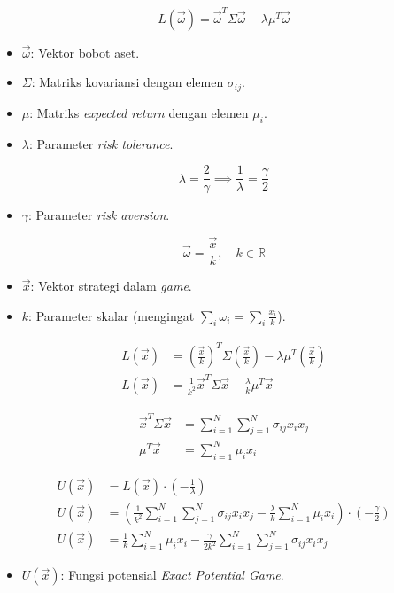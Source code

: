 \begin{equation}
    L(\vec{\omega}) = \vec{\omega}^T \Sigma \vec{\omega} - \lambda \mu^T \vec{\omega}
\end{equation}
\begin{itemize}
    \item $\vec{\omega}$: Vektor bobot aset.
    \item $\Sigma$: Matriks kovariansi dengan elemen $\sigma_{ij}$.
    \item $\mu$: Matriks \textit{expected return} dengan elemen $\mu_i$.
    \item $\lambda$: Parameter \textit{risk tolerance}.
\end{itemize}

\begin{equation}
    \lambda = \frac{2}{\gamma} \implies \frac{1}{\lambda} = \frac{\gamma}{2}
\end{equation}
\begin{itemize}
    \item $\gamma$: Parameter \textit{risk aversion}.
\end{itemize}

\begin{equation}
    \vec{\omega} = \frac{\vec{x}}{k}, \quad k \in \mathbb{R}
\end{equation}
\begin{itemize}
    \item $\vec{x}$: Vektor strategi dalam \textit{game}.
    \item $k$: Parameter skalar (mengingat $\sum_i \omega_i = \sum_i \frac{x_i}{k}$).
\end{itemize}

\begin{align}
    L(\vec{x}) &= \left( \frac{\vec{x}}{k} \right)^T \Sigma \left( \frac{\vec{x}}{k} \right) - \lambda \mu^T \left( \frac{\vec{x}}{k} \right) \\
    L(\vec{x}) &= \frac{1}{k^2} \vec{x}^T \Sigma \vec{x} - \frac{\lambda}{k} \mu^T \vec{x}
\end{align}

\begin{align}
    \vec{x}^T \Sigma \vec{x} &= \sum_{i=1}^N \sum_{j=1}^N \sigma_{ij} x_i x_j \\
    \mu^T \vec{x} &= \sum_{i=1}^N \mu_i x_i
\end{align}

\begin{align}
    U(\vec{x}) &= L(\vec{x}) \cdot \left( -\frac{1}{\lambda} \right) \\
    U(\vec{x}) &= \left( \frac{1}{k^2} \sum_{i=1}^N \sum_{j=1}^N \sigma_{ij} x_i x_j - \frac{\lambda}{k} \sum_{i=1}^N \mu_i x_i \right) \cdot \left( -\frac{\gamma}{2} \right) \\
    U(\vec{x}) &= \frac{1}{k} \sum_{i=1}^N \mu_i x_i - \frac{\gamma}{2k^2} \sum_{i=1}^N \sum_{j=1}^N \sigma_{ij} x_i x_j
\end{align}
\begin{itemize}
    \item $U(\vec{x})$: Fungsi potensial \textit{Exact Potential Game}.
\end{itemize}

